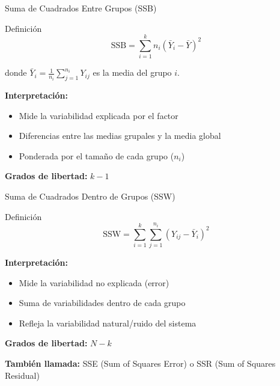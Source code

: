 \documentclass[10pt,aspectratio=169]{beamer}
\begin{document}
\begin{frame}{Suma de Cuadrados Entre Grupos (SSB)}
\begin{block}{Definición}
\begin{equation*}
\text{SSB} = \sum_{i=1}^{k} n_i (\bar{Y}_i - \bar{Y})^2
\end{equation*}
\end{block}

donde $\bar{Y}_i = \frac{1}{n_i} \sum_{j=1}^{n_i} Y_{ij}$ es la media del grupo $i$.

\vspace{0.5cm}

\textbf{Interpretación:}
\begin{itemize}
    \item Mide la variabilidad \alert{explicada por el factor}
    \item Diferencias entre las medias grupales y la media global
    \item Ponderada por el tamaño de cada grupo ($n_i$)
\end{itemize}

\vspace{0.3cm}

\textbf{Grados de libertad:} $k - 1$
\end{frame}

\begin{frame}{Suma de Cuadrados Dentro de Grupos (SSW)}
\begin{block}{Definición}
\begin{equation*}
\text{SSW} = \sum_{i=1}^{k} \sum_{j=1}^{n_i} (Y_{ij} - \bar{Y}_i)^2
\end{equation*}
\end{block}

\vspace{0.5cm}

\textbf{Interpretación:}
\begin{itemize}
    \item Mide la variabilidad \alert{no explicada} (error)
    \item Suma de variabilidades dentro de cada grupo
    \item Refleja la variabilidad natural/ruido del sistema
\end{itemize}

\vspace{0.3cm}

\textbf{Grados de libertad:} $N - k$

\vspace{0.3cm}

\textbf{También llamada:} SSE (Sum of Squares Error) o SSR (Sum of Squares Residual)
\end{frame}
\end{document}
